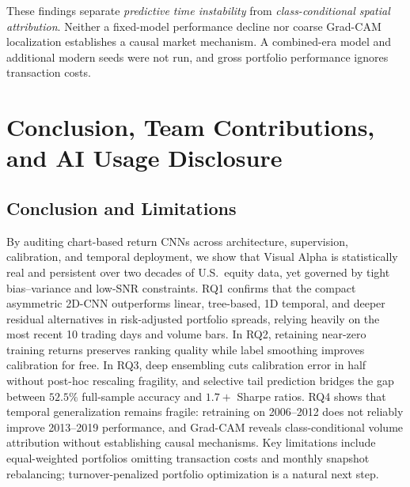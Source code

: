 \documentclass[10pt]{article}
\begin{document}
These findings separate \emph{predictive time instability} from
\emph{class-conditional spatial attribution}. Neither a fixed-model
performance decline nor coarse Grad-CAM localization establishes a causal
market mechanism. A combined-era model and additional modern seeds were
not run, and gross portfolio performance ignores transaction costs.

\section{Conclusion, Team Contributions, and AI Usage Disclosure}

\subsection{Conclusion and Limitations}
By auditing chart-based return CNNs across architecture, supervision, calibration, and temporal deployment, we show that Visual Alpha is statistically real and persistent over two decades of U.S.\ equity data, yet governed by tight bias--variance and low-SNR constraints. RQ1 confirms that the compact asymmetric 2D-CNN outperforms linear, tree-based, 1D temporal, and deeper residual alternatives in risk-adjusted portfolio spreads, relying heavily on the most recent 10 trading days and volume bars. In RQ2, retaining near-zero training returns preserves ranking quality while label smoothing improves calibration for free. In RQ3, deep ensembling cuts calibration error in half without post-hoc rescaling fragility, and selective tail prediction bridges the gap between $52.5\%$ full-sample accuracy and $1.7+$ Sharpe ratios. RQ4 shows that temporal generalization remains fragile: retraining on 2006--2012 does not reliably improve 2013--2019 performance, and Grad-CAM reveals class-conditional volume attribution without establishing causal mechanisms. Key limitations include equal-weighted portfolios omitting transaction costs and monthly snapshot rebalancing; turnover-penalized portfolio optimization is a natural next step.
\end{document}
